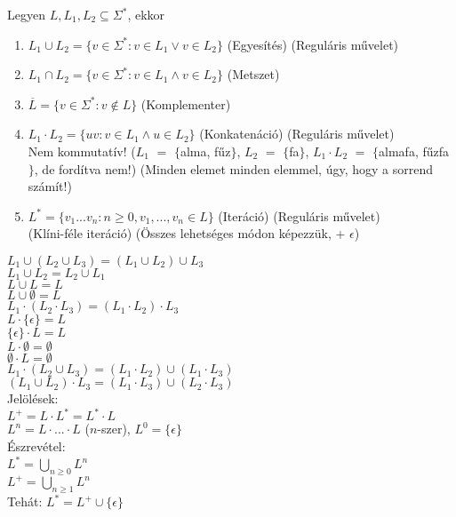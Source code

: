 \documentclass{beamer}
\newcommand{\msmallskip}{\vspace{0.3em}}
\newcommand{\mmedskip}{\vspace{0.5em}}
\newcommand{\mbigskip}{\vspace{1em}}
\begin{document}
\begin{frame}
\begin{tcolorbox}[squeezed title={Def.: Egyesítés,Metszet, Komplementer, Konkatenáció, Iteráció}]
Legyen $L, L_1, L_2 \subseteq {\Sigma}^*$, ekkor\\
\mmedskip
\begin{enumerate}
\item $L_1 \cup L_2 = \{v \in {\Sigma}^* : v \in L_1 \lor v \in L_2\}$ (Egyesítés) (Reguláris művelet)
\item $L_1 \cap L_2 = \{v \in {\Sigma}^* : v \in L_1 \land v \in L_2\}$ (Metszet)
\item $\overline{L} = \{v \in {\Sigma}^* : v \notin L\}$ (Komplementer)
\item $L_1 \cdot  L_2 = \{uv : v \in L_1 \land u \in L_2\}$ (Konkatenáció) (Reguláris művelet)\\
Nem kommutatív! ($L_1$ $=$ $\{$alma, fűz$\}$, $L_2$ $=$ $\{$fa$\}$, $L_1 \cdot L_2$ $=$ $\{$almafa, fűzfa$\}$, de fordítva nem!) (Minden elemet minden elemmel, úgy, hogy a sorrend számít!)
\item $L^* = \{v_1...v_n : n \geq 0, v_1, ..., v_n \in L\}$ (Iteráció) (Reguláris művelet)\\
(Klíni-féle iteráció) (Összes lehetséges módon képezzük, + $\epsilon$)
\end{enumerate}
\end{tcolorbox}

\end{frame}

\begin{frame}
\begin{tcolorbox}[title={Műveleti azonosságok}]
$L_1 \cup (L_2 \cup L_3) = (L_1 \cup L_2) \cup L_3$\\
$L_1 \cup L_2 = L_2  \cup L_1$\\
$L \cup L = L$\\
$L \cup \emptyset = L$\\
\mbigskip
$L_1 \cdot (L_2 \cdot L_3) = (L_1 \cdot L_2) \cdot L_3$\\
$L \cdot \{{\epsilon}\} = L$\\
$\{{\epsilon}\} \cdot L = L$\\
$L \cdot \emptyset = \emptyset$\\
$\emptyset \cdot L = \emptyset$\\
\mbigskip
$L_1 \cdot (L_2 \cup L_3) = (L_1 \cdot L_2) \cup (L_1 \cdot L_3)$\\
$(L_1 \cup L_2) \cdot L_3 = (L_1 \cdot L_3) \cup (L_2 \cdot L_3)$\\
\mbigskip
Jelölések:\\
\mmedskip
$L^+ = L \cdot L^* = L^* \cdot L$\\
$L^n = L \cdot ... \cdot L$ ($n$-szer), $L^0 = \{{\epsilon}\}$\\
\mmedskip
Észrevétel:\\
\mmedskip
$L^* = \bigcup_{n \geq 0} L^n$\\
$L^+ = \bigcup_{n \geq 1} L^n$\\
\msmallskip
Tehát: $L^* = L^+ \cup \{{\epsilon}\}$
\end{tcolorbox}

\end{frame}
\end{document}
